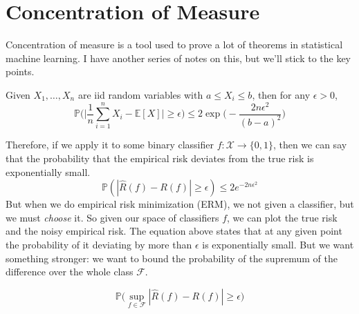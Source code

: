 \documentclass{article}
\begin{document}
\section{Concentration of Measure}

  Concentration of measure is a tool used to prove a lot of theorems in statistical machine learning. I have another series of notes on this, but we'll stick to the key points. 

  \begin{definition}
    Given $X_1, \ldots, X_n$ are iid random variables with $a \leq X_i \leq b$, then for any $\epsilon > 0$, 
    \begin{equation}
      \mathbb{P} \bigg( \bigg| \frac{1}{n} \sum_{i=1}^n X_i - \mathbb{E}[X] \bigg| \geq \epsilon \bigg) \leq 2 \exp \bigg( - \frac{2 n \epsilon^2}{(b - a)^2} \bigg)
    \end{equation}
  \end{definition}

  Therefore, if we apply it to some binary classifier $f: \mathcal{X} \rightarrow \{0, 1\}$, then we can say that the probability that the empirical risk deviates from the true risk is exponentially small. 
  \begin{equation}
    \mathbb{P} (|\hat{R} (f) - R(f)| \geq \epsilon) \leq 2e^{- 2 n \epsilon^2}
  \end{equation}
  But when we do empirical risk minimization (ERM), we not given a classifier, but we must \textit{choose} it. So given our space of classifiers $f$, we can plot the true risk and the noisy empirical risk. The equation above states that at any given point the probability of it deviating by more than $\epsilon$ is exponentially small. But we want something stronger: we want to bound the probability of the supremum of the difference over the whole class $\mathcal{F}$. 

  \begin{equation}
    \mathbb{P} \big( \sup_{f \in \mathcal{F}} | \hat{R} (f) - R(f) | \geq \epsilon \big)
  \end{equation}
\end{document}
